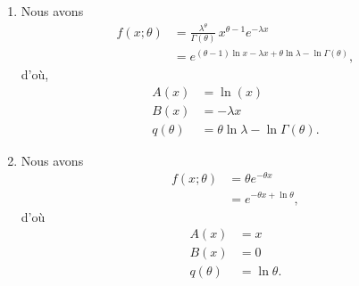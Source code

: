 \begin{exercice}
\begin{sol}
\begin{enumerate}
\begin{align*}
          \left(
            \ln (\sigma \sqrt{2\pi}) + \frac{\theta^2}{2\sigma^2}
          \right)
        \right\},
      \end{align*}
      d'où
      \begin{align*}
        A(x) &= x \\
        B(x) &= -\frac{x^2}{2\sigma^{2}} \\
        q(\theta) &= - \ln \sqrt{2\pi}\, \sigma -
          \frac{\theta^{2}}{2\sigma^{2}}.
      \end{align*}
    \item Nous avons
      \begin{align*}
        f(x; \theta) &=
        \frac{\lambda^\theta}{\Gamma(\theta)}\,
        x^{\theta-1}e^{-\lambda x} \\
        &= e^{(\theta-1)\ln x - \lambda x + \theta \ln \lambda -
          \ln \Gamma(\theta)},
      \end{align*}
      d'où,
      \begin{align*}
        A(x) &= \ln(x) \\
        B(x) &= -\lambda x \\
        q(\theta) &= \theta \ln \lambda - \ln \Gamma(\theta).
      \end{align*}
    \item Nous avons
      \begin{align*}
        f(x; \theta) & = \theta e^{-\theta x} \\
        &=e^{-\theta x + \ln \theta},
      \end{align*}
      d'où
      \begin{align*}
        A(x) &= x \\
        B(x) &= 0 \\
        q(\theta) &= \ln \theta.
      \end{align*}
    \end{enumerate}
  \end{sol}
\end{exercice}

